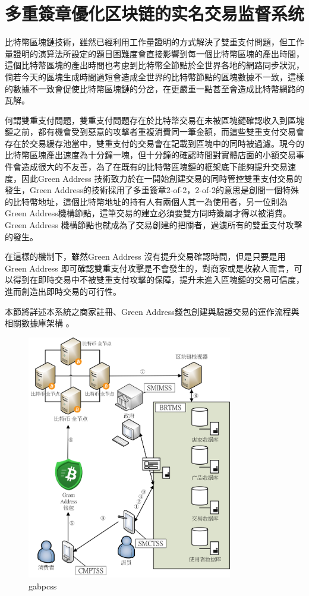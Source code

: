 
\chapter{多重簽章優化区块链的实名交易监督系统}

比特幣區塊鏈技術，雖然已經利用工作量證明的方式解決了雙重支付問題，但工作量證明的演算法所設定的題目困難度會直接影響到每一個比特幣區塊的產出時間，這個比特幣區塊的產出時間也考慮到比特幣全節點於全世界各地的網路同步狀況，倘若今天的區塊生成時間過短會造成全世界的比特幣節點的區塊數據不一致，這樣的數據不一致會促使比特幣區塊鏈的分岔，在更嚴重一點甚至會造成比特幣網路的瓦解。 

何謂雙重支付問題，雙重支付問題存在於比特幣交易在未被區塊鏈確認收入到區塊鏈之前，都有機會受到惡意的攻擊者重複消費同一筆金額，而這些雙重支付交易會存在於交易緩存池當中，雙重支付的交易會在記載到區塊中的同時被過濾。現今的比特幣區塊產出速度為十分鐘一塊，但十分鐘的確認時間對實體店面的小額交易事件會造成很大的不友善，為了在既有的比特幣區塊鏈的框架底下能夠提升交易速度，因此Green Address 技術致力於在一開始創建交易的同時管控雙重支付交易的發生，Green Address的技術採用了多重簽章2-of-2，2-of-2的意思是創間一個特殊的比特幣地址，這個比特幣地址的持有人有兩個人其一為使用者，另一位則為Green Address機構節點，這筆交易的建立必須要雙方同時簽屬才得以被消費。Green Address 機構節點也就成為了交易創建的把關者，過濾所有的雙重支付攻擊的發生。 

在這樣的機制下，雖然Green Address 沒有提升交易確認時間，但是只要是用Green Address 即可確認雙重支付攻擊是不會發生的，對商家或是收款人而言，可以得到在即時交易中不被雙重支付攻擊的保障，提升未進入區塊鏈的交易可信度，進而創造出即時交易的可行性。 

本節將詳述本系統之商家註冊、Green Address錢包創建與驗證交易的運作流程與相關數據庫架構 。

	\begin{figure}[h]
		\centering
		\includegraphics[width = 0.8\textwidth]{gabpcss.png}
		\caption{gabpcss}\label{gabpcss}
	\end{figure}

